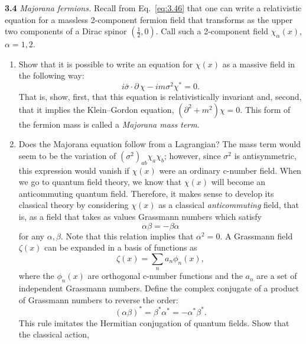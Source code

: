 \textbf{3.4} \emph{Majorana fermions.}  Recall from Eq.~\eqref{eq:3.46} that
one can write a relativistic equation for a massless 2-component fermion
field that transforms as the upper two components of a Dirac spinor
$(\tfrac{1}{2}, 0)$.  Call such a 2-component field $\chi_\alpha(x)$,
$\alpha = 1, 2$.
\begin{enumerate}[label=(\alph*)]
  \item Show that it is possible to write an equation for $\chi(x)$ as a
    massive field in the following way:
    \begin{equation}
      i\bar{\sigma}\cdot\partial\,\chi - im\sigma^2\chi^{*} = 0 .
    \end{equation}
    That is, show, first, that this equation is relativistically invariant
    and, second, that it implies the Klein--Gordon equation,
    $(\partial^2 + m^2)\chi = 0$.  This form of the fermion mass is called a
    \emph{Majorana mass term}.
  \item Does the Majorana equation follow from a Lagrangian?  The mass term
    would seem to be the variation of $(\sigma^2)_{ab}\chi_a\chi_b$; however,
    since $\sigma^2$ is antisymmetric, this expression would vanish if
    $\chi(x)$ were an ordinary c-number field.  When we go to quantum field
    theory, we know that $\chi(x)$ will become an anticommuting quantum
    field.  Therefore, it makes sense to develop its classical theory by
    considering $\chi(x)$ as a classical \emph{anticommuting} field, that is,
    as a field that takes as values Grassmann numbers which satisfy
    \begin{equation}
      \alpha\beta = -\beta\alpha
    \end{equation}
    for any $\alpha, \beta$.  Note that this relation implies that
    $\alpha^2 = 0$.  A Grassmann field $\zeta(x)$ can be expanded in a basis
    of functions as
    \begin{equation}
      \zeta(x) = \sum_n a_n\phi_n(x),
    \end{equation}
    where the $\phi_n(x)$ are orthogonal c-number functions and the $a_n$ are
    a set of independent Grassmann numbers.  Define the complex conjugate of
    a product of Grassmann numbers to reverse the order:
    \begin{equation}
      (\alpha\beta)^{*} = \beta^{*}\alpha^{*} = -\alpha^{*}\beta^{*} .
    \end{equation}
    This rule imitates the Hermitian conjugation of quantum fields.  Show
    that the classical action,
    \begin{equation}

\end{equation}
\end{enumerate}
